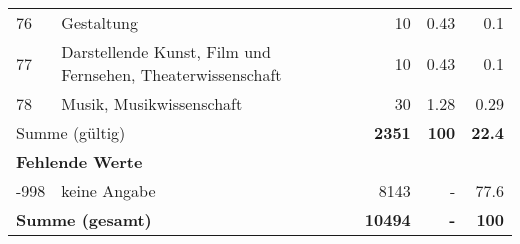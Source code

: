 \begin{longtable}{lXrrr}
        76 & \multicolumn{1}{X}{Gestaltung} & %
          \num{10} &
          \num[round-mode=places,round-precision=2]{0.43} &
          \num[round-mode=places,round-precision=2]{0.1} \\

        77 & \multicolumn{1}{X}{Darstellende Kunst, Film und Fernsehen, Theaterwissenschaft} & %
          \num{10} &
          \num[round-mode=places,round-precision=2]{0.43} &
          \num[round-mode=places,round-precision=2]{0.1} \\

        78 & \multicolumn{1}{X}{Musik, Musikwissenschaft} & %
          \num{30} &
          \num[round-mode=places,round-precision=2]{1.28} &
          \num[round-mode=places,round-precision=2]{0.29} \\

     \midrule
     \multicolumn{2}{l}{Summe (gültig)} &
       \textbf{\num{2351}} &
     \textbf{\num{100}} &
       \textbf{\num[round-mode=places,round-precision=2]{22.4}} \\
     \multicolumn{5}{l}{\textbf{Fehlende Werte}}\\
       -998 &
       keine Angabe &
         \num{8143} &
        - &
         \num[round-mode=places,round-precision=2]{77.6} \\
     \midrule
     \multicolumn{2}{l}{\textbf{Summe (gesamt)}} &
          \textbf{\num{10494}} &
        \textbf{-} &
        \textbf{\num{100}} \\
     \bottomrule
     \end{longtable}
     
